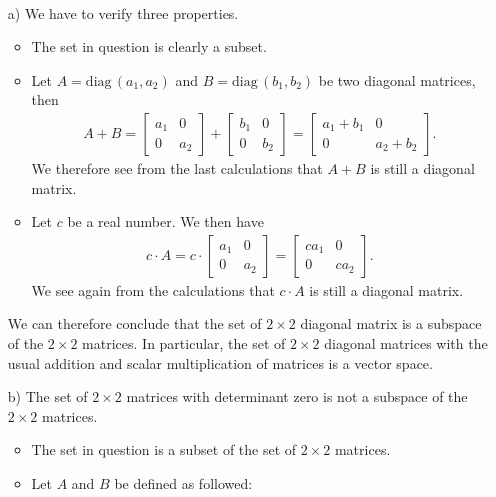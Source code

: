 \documentclass[12pt]{article}
\newcommand{\exo}[2]{\noindent\textcolor{red}{\fbox{\textbf{Section {#1}, Problem {#2}}}}\\}
\begin{document}
	\newpage
	
	\exo{2.2}{4}
	\begin{enumerate}
	\item[a)] We have to verify three properties.
		\begin{itemize}
		\item The set in question is clearly a subset.
		\item Let $A = \mathrm{diag}\, (a_1 , a_2)$ and $B = \mathrm{diag}\, (b_1 , b_2)$ be two diagonal matrices, then
			\begin{align*}
			A + B = \begin{bmatrix}
			a_1 & 0 \\ 0 & a_2
			\end{bmatrix} + \begin{bmatrix}
			b_1 & 0 \\ 0 & b_2
			\end{bmatrix} = \begin{bmatrix}
			a_1 + b_1 & 0 \\ 0 & a_2 + b_2
			\end{bmatrix} .
			\end{align*}
		We therefore see from the last calculations that $A+ B$ is still a diagonal matrix.
		\item Let $c$ be a real number. We then have
			\begin{align*}
			c \cdot A = c \cdot \begin{bmatrix}
			a_1 & 0 \\ 0 & a_2
			\end{bmatrix} = \begin{bmatrix}
			c a_1 & 0 \\ 0 & ca_2
			\end{bmatrix} .
			\end{align*}
		We see again from the calculations that $c \cdot A$ is still a diagonal matrix.
		\end{itemize}
	We can therefore conclude that the set of $2 \times 2$ diagonal matrix is a subspace of the $2 \times 2$ matrices. In particular, the set of $2 \times 2$ diagonal matrices with the usual addition and scalar multiplication of matrices is a vector space.
	\item[b)] The set of $2 \times 2$ matrices with determinant zero is not a subspace of the $2 \times 2$ matrices.
		\begin{itemize}
		\item The set in question is a subset of the set of $2 \times 2$ matrices.
		\item Let $A$ and $B$ be defined as followed:

\end{itemize}
\end{enumerate}
\end{document}
